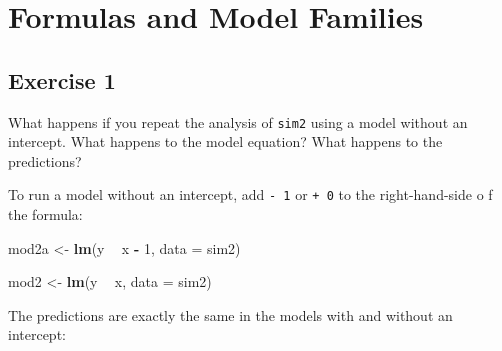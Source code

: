 \documentclass[]{book}
\newenvironment{Shaded}{\begin{snugshade}}{\end{snugshade}}
\newcommand{\CommentTok}[1]{\textcolor[rgb]{0.56,0.35,0.01}{\textit{#1}}}
\newcommand{\DataTypeTok}[1]{\textcolor[rgb]{0.13,0.29,0.53}{#1}}
\newcommand{\DecValTok}[1]{\textcolor[rgb]{0.00,0.00,0.81}{#1}}
\newcommand{\KeywordTok}[1]{\textcolor[rgb]{0.13,0.29,0.53}{\textbf{#1}}}
\newcommand{\NormalTok}[1]{#1}
\newcommand{\OperatorTok}[1]{\textcolor[rgb]{0.81,0.36,0.00}{\textbf{#1}}}
\newcommand{\StringTok}[1]{\textcolor[rgb]{0.31,0.60,0.02}{#1}}
\theoremstyle{definition}
\theoremstyle{definition}
\theoremstyle{definition}
\theoremstyle{remark}
\begin{document}
\hypertarget{formulas-and-model-families}{%
\section{Formulas and Model
Families}\label{formulas-and-model-families}}

\hypertarget{exercise-1-59}{%
\subsection{Exercise 1}\label{exercise-1-59}}

What happens if you repeat the analysis of \texttt{sim2} using a model
without an intercept. What happens to the model equation? What happens
to the predictions?

To run a model without an intercept, add \texttt{-\ 1} or \texttt{+\ 0}
to the right-hand-side o f the formula:

\begin{Shaded}
\begin{Highlighting}[]
\NormalTok{mod2a <-}\StringTok{ }\KeywordTok{lm}\NormalTok{(y }\OperatorTok{~}\StringTok{ }\NormalTok{x }\OperatorTok{-}\StringTok{ }\DecValTok{1}\NormalTok{, }\DataTypeTok{data =}\NormalTok{ sim2)}
\end{Highlighting}
\end{Shaded}

\begin{Shaded}
\begin{Highlighting}[]
\NormalTok{mod2 <-}\StringTok{ }\KeywordTok{lm}\NormalTok{(y }\OperatorTok{~}\StringTok{ }\NormalTok{x, }\DataTypeTok{data =}\NormalTok{ sim2)}
\end{Highlighting}
\end{Shaded}

The predictions are exactly the same in the models with and without an
intercept:

\begin{Shaded}
\end{Shaded}
\end{document}
